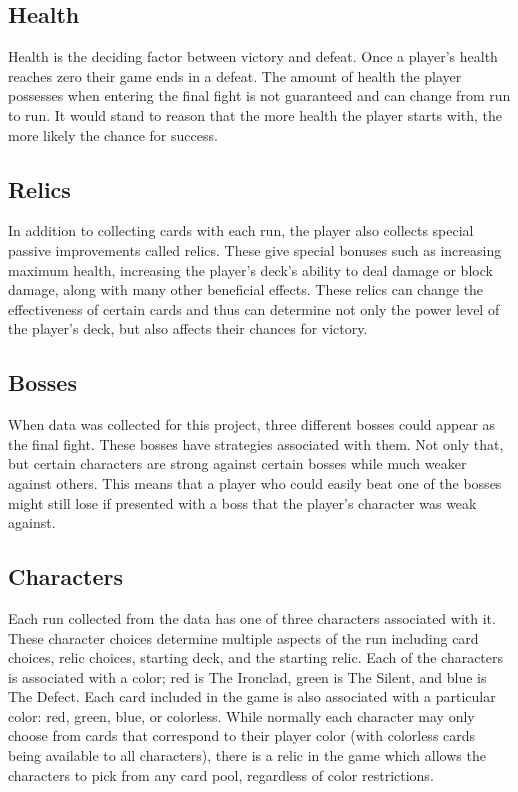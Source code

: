 \documentclass[10pt, a4paper, twocolumn]{article}
\begin{document}
\subsection{Health}
Health is the deciding factor between victory and defeat.  Once a player’s health reaches zero their game ends in a defeat.  The amount of health the player possesses when entering the final fight is not guaranteed and can change from run to run.  It would stand to reason that the more health the player starts with, the more likely the chance for success.

\subsection{Relics}
In addition to collecting cards with each run, the player also collects special passive improvements called relics.  These give special bonuses such as increasing maximum health, increasing the player’s deck’s ability to deal damage or block damage, along with many other beneficial effects.  These relics can change the effectiveness of certain cards and thus can determine not only the power level of the player’s deck, but also affects their chances for victory.

\subsection{Bosses}
When data was collected for this project, three different bosses could appear as the final fight.  These bosses have strategies associated with them.  Not only that, but certain characters are strong against certain bosses while much weaker against others.  This means that a player who could easily beat one of the bosses might still lose if presented with a boss that the player’s character was weak against.

\subsection{Characters}
Each run collected from the data has one of three characters associated with it.  These character choices determine multiple aspects of the run including card choices, relic choices, starting deck, and the starting relic.  Each of the characters is associated with a color; red is The Ironclad, green is The Silent, and blue is The Defect.  Each card included in the game is also associated with a particular color: red, green, blue, or colorless.  While normally each character may only choose from cards that correspond to their player color (with colorless cards being available to all characters), there is a relic in the game which allows the characters to pick from any card pool, regardless of color restrictions.
\end{document}
